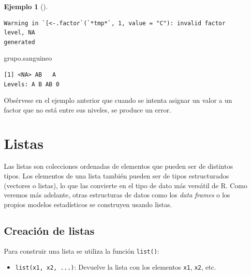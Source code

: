 \documentclass[
  spanish,
  a4paper,
]{scrreport}
\newenvironment{Shaded}{\begin{snugshade}}{\end{snugshade}}
\newcommand{\NormalTok}[1]{\textcolor[rgb]{0.00,0.23,0.31}{#1}}
\providecommand{\tightlist}{%
  \setlength{\itemsep}{0pt}\setlength{\parskip}{0pt}}
\theoremstyle{definition}
\theoremstyle{definition}
\newtheorem{example}{Ejemplo}[chapter]
\theoremstyle{remark}
\begin{document}
\begin{example}[]
\begin{verbatim}
Warning in `[<-.factor`(`*tmp*`, 1, value = "C"): invalid factor level, NA
generated
\end{verbatim}

\begin{Shaded}
\begin{Highlighting}[]
\NormalTok{grupo.sanguineo}
\end{Highlighting}
\end{Shaded}

\begin{verbatim}
[1] <NA> AB   A   
Levels: A B AB 0
\end{verbatim}

\end{example}

Obsérvese en el ejemplo anterior que cuando se intenta asignar un valor
a un factor que no está entre sus niveles, se produce un error.

\section{Listas}\label{listas}

Las listas son colecciones ordenadas de elementos que pueden ser de
distintos tipos. Los elementos de una lista también pueden ser de tipos
estructurados (vectores o listas), lo que las convierte en el tipo de
dato más versátil de R. Como veremos más adelante, otras estructuras de
datos como los \emph{data frames} o los propios modelos estadísticos se
construyen usando listas.

\subsection{Creación de listas}\label{creaciuxf3n-de-listas}

Para construir una lista se utiliza la función \texttt{list()}:

\begin{itemize}
\tightlist
\item
  \texttt{list(x1,\ x2,\ ...)}: Devuelve la lista con los elementos
  \texttt{x1}, \texttt{x2}, etc.
\end{itemize}
\end{document}
